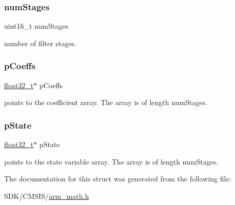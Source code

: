 \subsubsection{\texorpdfstring{num\+Stages}{numStages}}
{\footnotesize\ttfamily uint16\+\_\+t num\+Stages}

number of filter stages. \mbox{\label{structarm__fir__lattice__instance__f32_aacbb8dd8eeba4b21fc2bb40076405ee3}} 
\subsubsection{\texorpdfstring{p\+Coeffs}{pCoeffs}}
{\footnotesize\ttfamily \mbox{\hyperlink{arm__math_8h_a4611b605e45ab401f02cab15c5e38715}{float32\+\_\+t}}$\ast$ p\+Coeffs}

points to the coefficient array. The array is of length num\+Stages. \mbox{\label{structarm__fir__lattice__instance__f32_a335c87e6fdc4b96601d95a5de8b9c463}} 
\subsubsection{\texorpdfstring{p\+State}{pState}}
{\footnotesize\ttfamily \mbox{\hyperlink{arm__math_8h_a4611b605e45ab401f02cab15c5e38715}{float32\+\_\+t}}$\ast$ p\+State}

points to the state variable array. The array is of length num\+Stages. 

The documentation for this struct was generated from the following file\+:\begin{DoxyCompactItemize}
\item 
S\+D\+K/\+C\+M\+S\+I\+S/\mbox{\hyperlink{arm__math_8h}{arm\+\_\+math.\+h}}\end{DoxyCompactItemize}
